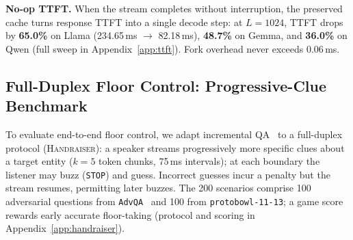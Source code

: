 \documentclass{article}
\begin{document}
\textbf{No-op TTFT.} When the stream completes without interruption, the preserved cache turns response TTFT into a single decode step: at $L{=}1024$, TTFT drops by \textbf{65.0\%} on Llama (234.65\,ms $\to$ 82.18\,ms), \textbf{48.7\%} on Gemma, and \textbf{36.0\%} on Qwen (full sweep in Appendix~\ref{app:ttft}). Fork overhead never exceeds 0.06\,ms.

\subsection{Full-Duplex Floor Control: Progressive-Clue Benchmark}
\label{sec:handraiser}

To evaluate end-to-end floor control, we adapt incremental QA~\citep{rodriguez2021quizbowl} to a full-duplex protocol (\textsc{Handraiser}): a speaker streams progressively more specific clues about a target entity ($k{=}5$ token chunks, 75\,ms intervals); at each boundary the listener may buzz (\texttt{STOP}) and guess. Incorrect guesses incur a penalty but the stream resumes, permitting later buzzes. The 200 scenarios comprise 100 adversarial questions from \texttt{AdvQA}~\citep{wallace2019trick} and 100 from \texttt{protobowl-11-13}; a game score rewards early accurate floor-taking (protocol and scoring in Appendix~\ref{app:handraiser}).

\begin{table}[t]
\centering
\caption{\textbf{\textsc{Handraiser} multi-attempt floor control (200 scenarios, $k{=}5$).} Cumulative redundant context re-prefill tokens per scenario (single-pass baseline: 576.2 tok; Appendix~\ref{app:tokens}).}
\label{tab:handraiser_results}
\renewcommand{\arraystretch}{0.88}
\end{table}
\end{document}

